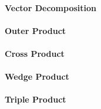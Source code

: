 \paragraph{Vector Decomposition}




\paragraph{Outer Product}

\paragraph{Cross Product}


\paragraph{Wedge Product}

\paragraph{Triple Product}









